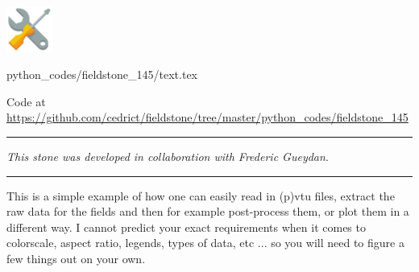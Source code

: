 \includegraphics[height=1.5cm]{images/pictograms/tools}


\begin{flushright} {\tiny {\color{gray} python\_codes/fieldstone\_145/text.tex}} \end{flushright}

%

\begin{center}

Code at \url{https://github.com/cedrict/fieldstone/tree/master/python_codes/fieldstone_145}
\end{center}

\par\noindent\rule{\textwidth}{0.4pt}

{\sl This stone was developed in collaboration with Frederic Gueydan}. 

\par\noindent\rule{\textwidth}{0.4pt}

This \stone is a simple example of how one can easily read in (p)vtu files, extract the raw data for the fields and 
then for example post-process them, or plot them in a different way.
I cannot predict your exact requirements when it comes to colorscale, aspect ratio, legends, types of data, etc ...
so you will need to figure a few things out on your own. 


